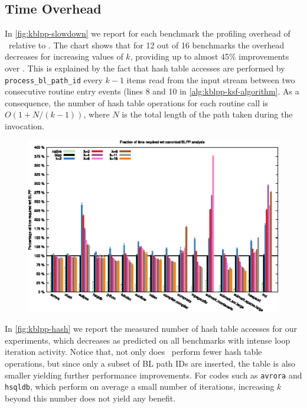 \subsection{Time Overhead}
\label{ss:eval-kblpp-time}

In \myfigure\ref{fig:kblpp-slowdown} we report for each benchmark the profiling overhead of \kblpp\ relative to \blpp. The chart shows that for 12 out of 16 benchmarks the overhead decreases for increasing values of $k$, providing up to almost 45\% improvements over \blpp. This is explained by the fact that hash table accesses are performed by {\tt process\_bl\_path\_id} every $k-1$ items read from the input stream between two consecutive routine entry events (lines 8 and 10 in \myalgorithm\ref{alg:kblpp-ksf-algorithm}. As a consequence, the number of hash table operations for each routine call is $O(1+N/(k-1))$, where $N$ is the total length of the path taken during the invocation.

\ifdefined\noauthorea
\begin{figure}[!ht]
\begin{center}
\includegraphics[width=\textwidth]{figures/kblpp-slowdown/kblpp-slowdown.eps}
\caption{\protect}
\end{center}
\end{figure}
\fi

In \myfigure\ref{fig:kblpp-hash} we report the measured number of hash table accesses for our experiments, which decreases as predicted on all benchmarks with intense loop iteration activity. Notice that, not only does \kblpp\ perform fewer hash table operations, but since only a subset of BL path IDs are inserted, the table is also smaller yielding further performance improvements. For codes such as {\tt avrora} and {\tt hsqldb}, which perform on average a small number of iterations, increasing $k$ beyond this number does not yield any benefit.

